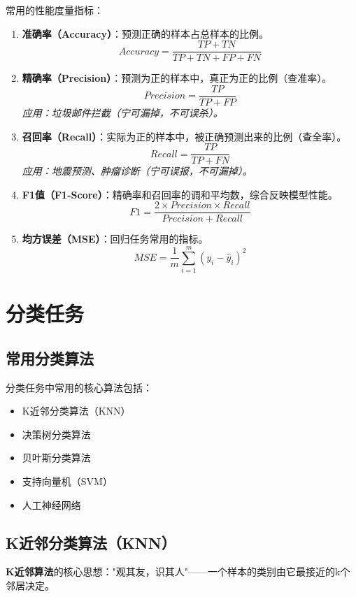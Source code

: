 常用的性能度量指标：
\begin{enumerate}[leftmargin=2em,itemsep=5pt]
    \item \textbf{准确率（Accuracy）}：预测正确的样本占总样本的比例。
    $$Accuracy = \frac{TP + TN}{TP + TN + FP + FN}$$
    
    \item \textbf{精确率（Precision）}：预测为正的样本中，真正为正的比例（查准率）。
    $$Precision = \frac{TP}{TP + FP}$$
    \textit{应用：垃圾邮件拦截（宁可漏掉，不可误杀）。}
    
    \item \textbf{召回率（Recall）}：实际为正的样本中，被正确预测出来的比例（查全率）。
    $$Recall = \frac{TP}{TP + FN}$$
    \textit{应用：地震预测、肿瘤诊断（宁可误报，不可漏掉）。}
    
    \item \textbf{F1值（F1-Score）}：精确率和召回率的调和平均数，综合反映模型性能。
    $$F1 = \frac{2 \times Precision \times Recall}{Precision + Recall}$$
    
    \item \textbf{均方误差（MSE）}：回归任务常用的指标。
    $$MSE = \frac{1}{m} \sum_{i=1}^{m} (y_i - \hat{y}_i)^2$$
\end{enumerate}

\section{分类任务}

\subsection{常用分类算法}

分类任务中常用的核心算法包括：
\begin{itemize}[leftmargin=2em,itemsep=0pt]
    \item K近邻分类算法（KNN）
    \item 决策树分类算法
    \item 贝叶斯分类算法
    \item 支持向量机（SVM）
    \item 人工神经网络
\end{itemize}

\subsection{K近邻分类算法（KNN）}

\begin{conceptbox}
\textbf{K近邻算法}的核心思想："观其友，识其人"——一个样本的类别由它最接近的k个邻居决定。
\end{conceptbox}

